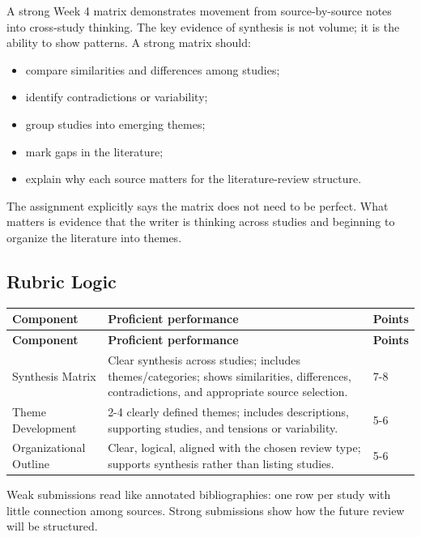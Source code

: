 \documentclass[10pt,letterpaper]{article}
\begin{document}
A strong Week 4 matrix demonstrates movement from source-by-source notes into cross-study thinking. The key evidence of synthesis is not volume; it is the ability to show patterns. A strong matrix should:

\begin{itemize}
\item compare similarities and differences among studies;
\item identify contradictions or variability;
\item group studies into emerging themes;
\item mark gaps in the literature;
\item explain why each source matters for the literature-review structure.
\end{itemize}

The assignment explicitly says the matrix does not need to be perfect. What matters is evidence that the writer is thinking across studies and beginning to organize the literature into themes.

\subsection{Rubric Logic}

\begin{longtable}{L{3.0cm} L{9.8cm} L{1.3cm}}
\toprule
{}
\textbf{Component} & \textbf{Proficient performance} & \textbf{Points}\\
\midrule
\endfirsthead
\toprule
{}
\textbf{Component} & \textbf{Proficient performance} & \textbf{Points}\\
\midrule
\endhead
\bottomrule
\endfoot
Synthesis Matrix & Clear synthesis across studies; includes themes/categories; shows similarities, differences, contradictions, and appropriate source selection. & 7-8\\
Theme Development & 2-4 clearly defined themes; includes descriptions, supporting studies, and tensions or variability. & 5-6\\
Organizational Outline & Clear, logical, aligned with the chosen review type; supports synthesis rather than listing studies. & 5-6\\
\end{longtable}

Weak submissions read like annotated bibliographies: one row per study with little connection among sources. Strong submissions show how the future review will be structured.
\end{document}
